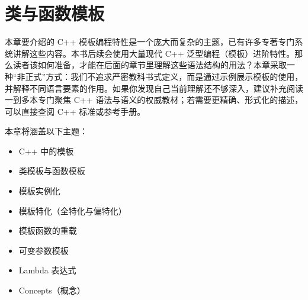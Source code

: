 \chapter{类与函数模板}

本章要介绍的 C++ 模板编程特性是一个庞大而复杂的主题，已有许多专著专门系统讲解这些内容。本书后续会使用大量现代 C++ 泛型编程（模板）进阶特性。那么读者该如何准备，才能在后面的章节里理解这些语法结构的用法？本章采取一种“非正式”方式：我们不追求严密教科书式定义，而是通过示例展示模板的使用，并解释不同语言要素的作用。如果你发现自己当前理解还不够深入，建议补充阅读一到多本专门聚焦 C++ 语法与语义的权威教材；若需要更精确、形式化的描述，可以直接查阅 C++ 标准或参考手册。

本章将涵盖以下主题：

\begin{itemize}
\item C++ 中的模板
\item 类模板与函数模板
\item 模板实例化
\item 模板特化（全特化与偏特化）
\item 模板函数的重载
\item 可变参数模板
\item Lambda 表达式
\item Concepts（概念）
\end{itemize}

